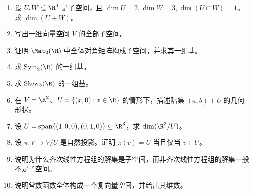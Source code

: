 \begin{enumerate}[label=\arabic*., leftmargin=2.5em]
  \item \basic 设 $U,W\subseteq \R^4$ 是子空间，且 $\dim U=2,\dim W=3,\dim(U\cap W)=1$。求 $\dim(U+W)$。
  \item \basic 写出一维向量空间 $V$ 的全部子空间。
  \item \basic 证明 $\Mat_2(\R)$ 中全体对角矩阵构成子空间，并求其一组基。
  \item \basic 求 $\mathrm{Sym}_2(\R)$ 的一组基。
  \item \basic 求 $\mathrm{Skew}_3(\R)$ 的一组基。
  \item \basic 在 $V=\R^2$、$U=\{(x,0):x\in\R\}$ 的情形下，描述陪集 $(a,b)+U$ 的几何形状。
  \item \basic 设 $U=\mathrm{span}\{(1,0,0),(0,1,0)\}\subseteq \R^3$。求 $\dim(\R^3/U)$。
  \item \basic 设 $\pi:V\to V/U$ 是自然投影。证明 $\pi(v)=U$ 当且仅当 $v\in U$。
  \item \basic 说明为什么齐次线性方程组的解集是子空间，而非齐次线性方程组的解集一般不是子空间。
  \item \basic 说明常数函数全体构成一个复向量空间，并给出其维数。
\end{enumerate}

